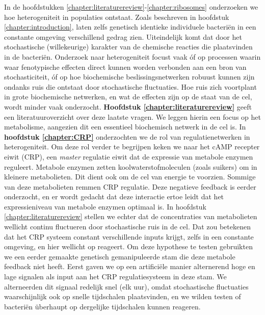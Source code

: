In de hoofdstukken \ref{chapter:literaturereview}-\ref{chapter:ribosomes} onderzoeken we hoe heterogeniteit in populaties ontstaat.
%
Zoals beschreven in hoofdstuk \ref{chapter:introduction}, laten zelfs genetisch identieke individuele bacteriën in een constante omgeving verschillend gedrag zien.
%
Uiteindelijk komt dat door het stochastische (willekeurige) karakter van de chemische reacties die plaatsvinden in de bacteriën.
%
Onderzoek naar heterogeniteit focust vaak 
óf op processen waarin waar fenotypische effecten direct kunnen worden verbonden aan een bron van stochasticiteit,
óf op hoe biochemische beslissingsnetwerken robuust kunnen zijn ondanks ruis die ontstaat door stochastische fluctuaties.
%
Hoe ruis zich voortplant in grote biochemische netwerken, en wat de effecten zijn op de staat van de cel, wordt minder vaak onderzocht.
%
\textbf{Hoofdstuk \ref{chapter:literaturereview}} geeft een literatuuroverzicht over deze laatste vragen.
%
We leggen hierin een focus op het metabolisme, aangezien dit een essentieel biochemisch netwerk in de cel is.
%
In \textbf{hoofdstuk \ref{chapter:CRP}} onderzochten we de rol van regulatienetwerken in heterogeniteit.
%
Om deze rol verder te begrijpen keken we naar het 
cAMP recepter eiwit (CRP), een \textit{master} regulatie eiwit dat de expressie van metabole enzymen reguleert.
%
Metabole enzymen zetten koolwaterstofmoleculen (zoals suikers) om in kleinere metabolieten. 
Dit dient ook om de cel van energie te voorzien.
%
Sommige van deze metabolieten remmen CRP regulatie.
%
Deze negatieve feedback is eerder onderzocht, en 
er wordt gedacht dat deze interactie ertoe leidt dat
het expressieniveau van metabole enzymen optimaal is.
%
In hoofdstuk \ref{chapter:literaturereview} stellen we echter dat de concentraties van metabolieten wellicht continu fluctueren door stochastische ruis in de cel.
%
Dat zou betekenen dat het CRP systeem constant verschillende inputs krijgt, 
zelfs in een constante omgeving, 
en hier wellicht op reageert.
%
Om deze hypothese te testen gebruikten we een eerder gemaakte
genetisch gemanipuleerde \ecoli stam die deze metabole feedback niet heeft.
%
Eerst gaven we op een artificiële manier alternerend hoge en lage signalen als input aan het CRP regulatiesysteem in deze stam.
%
We alterneerden dit signaal redelijk snel (elk uur), 
omdat stochastische fluctuaties waarschijnlijk ook op snelle tijdschalen plaatsvinden,
en we wilden testen of bacteriën überhaupt op dergelijke tijdschalen kunnen reageren.

